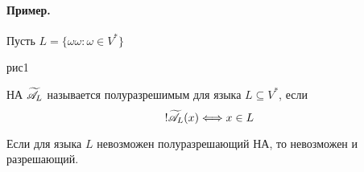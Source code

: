 \paragraph*{Пример.} Пусть $L = \{\omega\omega: \omega \in V^{*}\} $ 

рис1

\begin{definition}
НА $\widetilde{\mathscr{A}_L}$ называется полуразрешимым для языка $L \subseteq V^{*}$, если
\[
!\widetilde{\mathscr{A}_L}(x) \Longleftrightarrow x \in L\\
\] 
\end{definition}

\begin{theorem}
Если для языка $L$ невозможен полуразрешающий НА, то невозможен и разрешающий.
\end{theorem}


